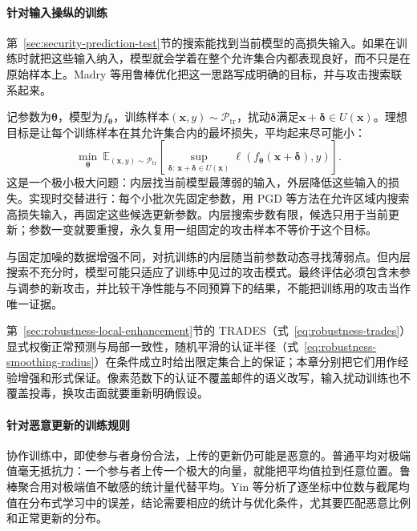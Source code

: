 \paragraph{针对输入操纵的训练}

第~\ref{sec:security-prediction-test}节的搜索能找到当前模型的高损失输入。如果在训练时就把这些输入纳入，模型就会学着在整个允许集合内都表现良好，而不只是在原始样本上。Madry 等用鲁棒优化把这一思路写成明确的目标，并与攻击搜索联系起来。

记参数为$\bm\theta$，模型为$f_{\bm\theta}$，训练样本$(\bm x,y)\sim\mathcal P_{\mathrm{tr}}$，扰动$\bm\delta$满足$\bm x+\bm\delta\in U(\bm x)$。理想目标是让每个训练样本在其允许集合内的最坏损失，平均起来尽可能小：
\begin{equation}
 \min_{\bm\theta}\ \mathbb E_{(\bm x,y)\sim\mathcal P_{\mathrm{tr}}}
 \left[\sup_{\bm\delta:\,\bm x+\bm\delta\in U(\bm x)}
  \ell(f_{\bm\theta}(\bm x+\bm\delta),y)\right].
 \label{eq:security-adversarial-training}
\end{equation}
这是一个极小极大问题：内层找当前模型最薄弱的输入，外层降低这些输入的损失。实现时交替进行：每个小批次先固定参数，用 PGD 等方法在允许区域内搜索高损失输入，再固定这些候选更新参数。内层搜索步数有限，候选只用于当前更新；参数一变就要重搜，永久复用一组固定的攻击样本不等价于这个目标。

与固定加噪的数据增强不同，对抗训练的内层随当前参数动态寻找薄弱点。但内层搜索不充分时，模型可能只适应了训练中见过的攻击模式。最终评估必须包含未参与调参的新攻击，并比较干净性能与不同预算下的结果，不能把训练用的攻击当作唯一证据。

第~\ref{sec:robustness-local-enhancement}节的 TRADES（式~\eqref{eq:robustness-trades}）显式权衡正常预测与局部一致性，随机平滑的认证半径（式~\eqref{eq:robustness-smoothing-radius}）在条件成立时给出限定集合上的保证；本章分别把它们用作经验增强和形式保证。像素范数下的认证不覆盖邮件的语义改写，输入扰动训练也不覆盖投毒，换攻击面就要重新明确假设。

\paragraph{针对恶意更新的训练规则}

协作训练中，即使参与者身份合法，上传的更新仍可能是恶意的。普通平均对极端值毫无抵抗力：一个参与者上传一个极大的向量，就能把平均值拉到任意位置。鲁棒聚合用对极端值不敏感的统计量代替平均。Yin 等分析了逐坐标中位数与截尾均值在分布式学习中的误差，结论需要相应的统计与优化条件，尤其要匹配恶意比例和正常更新的分布。

